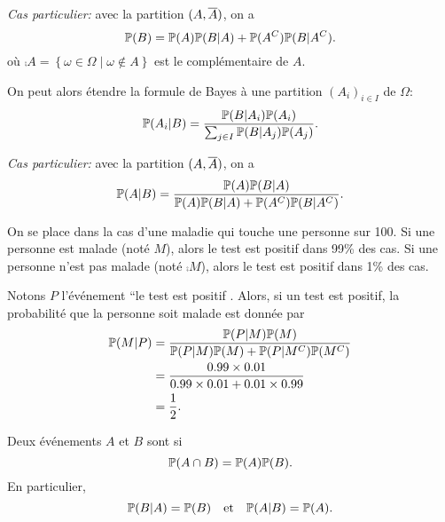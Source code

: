\emph{Cas particulier:} avec la partition \((A,\overline{A})\), on a
\begin{equation*}
    \mathbb{P}(B) = \mathbb{P}(A)\mathbb{P}(B|A) + \mathbb{P}({A}^C)\mathbb{P}(B|{A}^C).
\end{equation*}
où \(\comp A = \left\{\omega\in\Omega\mid \omega\notin A\right\}\) est le complémentaire de \(A\).

On peut alors étendre la formule de Bayes à une partition \((A_i)_{i\in I}\) de \(\Omega\):
\begin{equation*}
    \mathbb{P}(A_i|B) = \frac{\mathbb{P}(B|A_i)\mathbb{P}(A_i)}{\sum_{j\in I} \mathbb{P}(B|A_j)\mathbb{P}(A_j)}.
\end{equation*}

\emph{Cas particulier:} avec la partition \((A,\overline{A})\), on a
\begin{equation*}
    \mathbb{P}(A|B) = \frac{\mathbb{P}(A)\mathbb{P}(B|A)}{\mathbb{P}(A)\mathbb{P}(B|A) + \mathbb{P}({A}^C)\mathbb{P}(B|{A}^C)}.
\end{equation*}

\begin{example}
    On se place dans la cas d'une maladie qui touche une personne sur 100.
    Si une personne est malade (noté \(M\)), alors le test est positif dans 99\% des cas.
    Si une personne n'est pas malade (noté \(\comp M\)), alors le test est positif dans 1\% des cas.

    Notons \(P\) l'événement ``le test est positif \fg{}. Alors, si un test est positif,
    la probabilité que la personne soit malade est donnée par
    \begin{equation*}
        \begin{aligned}
            \mathbb{P}(M|P) 
            &= \frac{\mathbb{P}(P|M)\mathbb{P}(M)}{\mathbb{P}(P|M)\mathbb{P}(M) + \mathbb{P}(P|{M}^C)\mathbb{P}({M}^C)}\\
            &= \frac{0.99\times 0.01}{0.99\times 0.01 + 0.01\times 0.99}\\
            &= \frac{1}{2}.
        \end{aligned}
    \end{equation*}
\end{example}

\begin{definition}
    Deux événements \(A\) et \(B\) sont  si
    \begin{equation*}
        \mathbb{P}(A\cap B) = \mathbb{P}(A)\mathbb{P}(B).
    \end{equation*}
    En particulier,
    \begin{equation*}
        \mathbb{P}(B|A) = \mathbb{P}(B) \quad \text{et} \quad \mathbb{P}(A|B) = \mathbb{P}(A).
    \end{equation*}
\end{definition}

